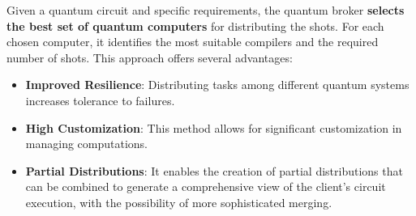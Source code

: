 Given a quantum circuit and specific requirements, the quantum broker \textbf{selects the best set of quantum computers} for distributing the shots. For each chosen computer, it identifies the most suitable compilers and the required number of shots. This approach offers several advantages:

\begin{itemize}
    \item \textbf{Improved Resilience}: Distributing tasks among different quantum systems increases tolerance to failures.
    \item \textbf{High Customization}: This method allows for significant customization in managing computations.
    \item \textbf{Partial Distributions}: It enables the creation of partial distributions that can be combined to generate a comprehensive view of the client's circuit execution, with the possibility of more sophisticated merging.
\end{itemize}
